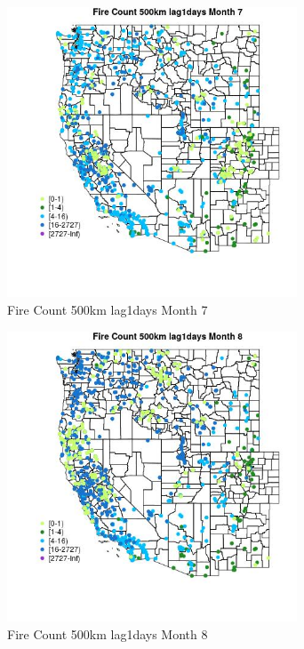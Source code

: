 \begin{figure} 
\centering  
\includegraphics[width=0.77\textwidth]{Code_Outputs/Report_ML_input_PM25_Step4_part_f_de_duplicated_aves_prioritize_24hr_obswNAs_MapObsMo7Fire_Count_500km_lag1days.jpg} 
\caption{\label{fig:Report_ML_input_PM25_Step4_part_f_de_duplicated_aves_prioritize_24hr_obswNAsMapObsMo7Fire_Count_500km_lag1days}Fire Count 500km lag1days Month 7} 
\end{figure} 
 

\begin{figure} 
\centering  
\includegraphics[width=0.77\textwidth]{Code_Outputs/Report_ML_input_PM25_Step4_part_f_de_duplicated_aves_prioritize_24hr_obswNAs_MapObsMo8Fire_Count_500km_lag1days.jpg} 
\caption{\label{fig:Report_ML_input_PM25_Step4_part_f_de_duplicated_aves_prioritize_24hr_obswNAsMapObsMo8Fire_Count_500km_lag1days}Fire Count 500km lag1days Month 8} 
\end{figure} 
 

